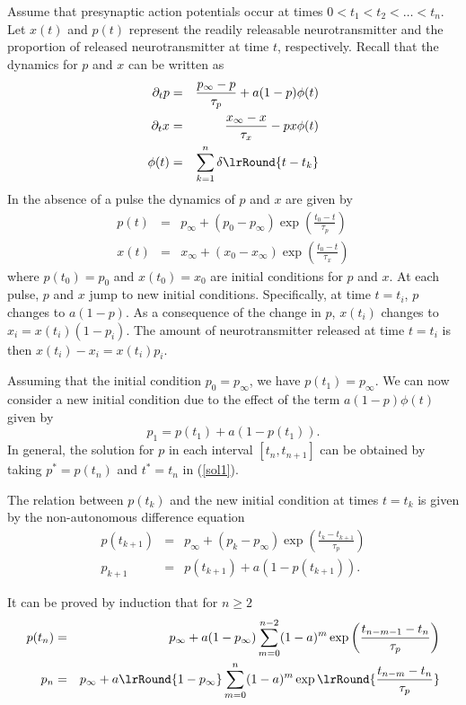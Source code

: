 \documentclass[10pt]{article}
\begin{document}
Assume that presynaptic action potentials occur at times $0<t_1<t_2<\ldots<t_n$. Let 
$x(t)$ and $p(t)$ represent the readily releasable neurotransmitter and the proportion of released neurotransmitter at time $t$, respectively.
Recall that the dynamics for $p$ and $x$ can be written as
\begin{eqnarray*}
\label{modelo}
\partial_t p &=& \frac{p_{\infty}-p}{\tau_p} + a(1-p) \phi(t)
\\
\partial_t x &=& \frac{x_{\infty}-x}{\tau_x} - px \phi(t)
\\
\phi(t) &=& \sum_{k=1}^{n} \delta\lrRound{t-t_k}
\end{eqnarray*}
In the absence of a pulse the dynamics of $p$ and $x$ are given by
\begin{eqnarray*}
\label{pxNoPulseDynamics}
p(t)&=&p_{\infty}+(p_0-p_{\infty})\exp{\left(\frac{t_0-t}{\tau_p}\right)}
\\
x(t)&=&x_{\infty}+(x_0-x_{\infty})\exp{\left(\frac{t_0-t}{\tau_x}\right)}
\end{eqnarray*}
where $p(t_0)=p_0$ and $x(t_0)=x_0$ are initial conditions for $p$ and $x$. 
At each pulse, $p$ and $x$ jump to new initial conditions.  Specifically, 
at time $t=t_i$, $p$ changes to $a (1-p)$. As a consequence of the change in $p$, $x(t_i)$ changes to $x_i = x(t_i) (1- p_i)$. The amount of neurotransmitter released at time $t=t_i$ is then $x(t_i)- x_i = x(t_i) p_i$.

Assuming that the initial condition $p_0=p_{\infty}$, we have $p(t_1)=p_{\infty}$. We can now consider a new initial condition due to the effect of the term $a(1-p)\phi (t)$ given by
\[p_1=p(t_1)+a(1-p(t_1)).\]
In general, the solution for $p$ in each interval $\left[t_n,t_{n+1}\right]$ can be obtained by taking $p^*=p(t_n)$ and $t^*=t_n$ in (\ref{sol1}).

The relation between $p(t_k)$ and the new initial condition at times $t=t_k$ is given by the non-autonomous difference equation
\begin{equation}
    \label{DE}
        \begin{array}{rcl}
             p(t_{k+1})&=&p_{\infty} + (p_k-p_{\infty})\exp{\left(\frac{t_k-t_{k+1}}{\tau_p}\right)} \\
             p_{k+1}& = & p(t_{k+1}) + a (1-p(t_{k+1})).
        \end{array}
\end{equation}

It can be proved by induction that for $n\geq2$
\begin{eqnarray*}
p(t_n)&=&p_{\infty} + a(1-p_{\infty})\sum_{m=0}^{n-2}(1-a)^m \exp{\left(\frac{t_{n-m-1}-t_{n}}{\tau_p}\right)}
\\ 
p_{n} &=& p_{\infty} + a \lrRound{1-p_{\infty}} \sum_{m=0}^{n} (1-a)^m \exp \lrRound{\frac{t_{n-m}- t_{n}}{\tau_p}} 
\end{eqnarray*}
\end{document}
